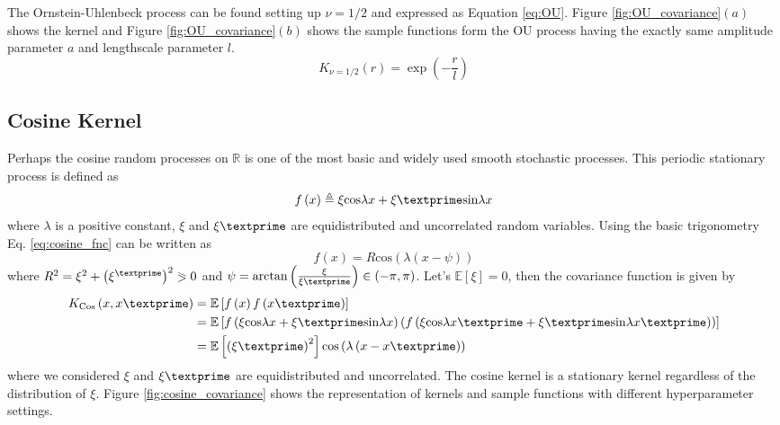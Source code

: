 The Ornstein-Uhlenbeck process can be found setting up $\nu=1/2$ and expressed as Equation \ref{eq:OU}. Figure \ref{fig:OU_covariance}$(a)$ shows the kernel and Figure \ref{fig:OU_covariance}$(b)$ shows the sample functions form the OU process having the exactly same amplitude parameter $a$ and lengthscale parameter $l$.  
\begin{equation} \label{eq:OU}
K_{\nu=1/2}(r)=	\exp \left(-\frac{r}{l} \right)
\end{equation}

\subsection{Cosine Kernel}
Perhaps the cosine random processes on $\mathbb{R}$ is one of the most  basic and widely used smooth stochastic processes. This periodic stationary process is defined as
\begin{equation} \label{eq:cosine_fnc}
f\left(x\right) \triangleq \xi\text{cos}\lambda x+ \xi\textprime \text{sin}\lambda x  
\end{equation}
where $\lambda$ is a positive constant, $\xi$ and $\xi\textprime$ are equidistributed and uncorrelated random variables. Using the basic trigonometry Eq. \ref{eq:cosine_fnc} can be written as
\begin{equation} \label{eq:cosine_fnc2}
f\left(x\right) = R \text{cos}\left(\lambda\left(x-\psi\right)\right) 
\end{equation}
where $R^2=\xi^2+\left(\xi^\textprime\right)^2\eqslantgtr 0$ and $\psi=\text{arctan}\left(\frac{\xi}{\xi\textprime}\right) \in \left(-\pi,\pi \right)$. Let's $\mathbb{E}\left[\xi\right]=0$, then the covariance function is given by
\begin{equation*} \label{eq:cosine_cov}
\begin{split}
K_{\text{Cos}}\left(x,x\textprime\right) 
    &= \mathbb{E}\left[f\left(x\right)f\left(x\textprime\right)\right]\\
    &= \mathbb{E}\left[f\left(\xi\text{cos}\lambda x+ \xi\textprime \text{sin}\lambda x\right)\left(f\left(\xi\text{cos}\lambda x\textprime+ \xi\textprime \text{sin}\lambda x\textprime\right)\right)\right]\\
    &= \mathbb{E}\left[\left(\xi\textprime\right)^2\right]\text{cos}\left(\lambda\left(x-x\textprime\right)\right)\\
\end{split}
\end{equation*}
where we considered  $\xi$ and $\xi\textprime$ are equidistributed and uncorrelated. The cosine kernel is a stationary kernel regardless of the distribution of $\xi$. Figure \ref{fig:cosine_covariance} shows the representation of kernels and sample functions with different hyperparameter settings.


